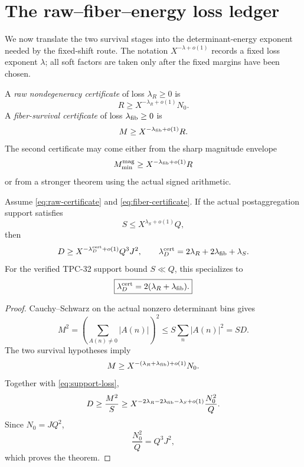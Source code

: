 \section{The raw--fiber--energy loss ledger}
\label{sec:loss-ledger}

We now translate the two survival stages into the determinant-energy
exponent needed by the fixed-shift route.  The notation
\(X^{-\lambda+o(1)}\) records a fixed loss exponent \(\lambda\);
all soft factors are taken only after the fixed margins have been
chosen.

\begin{definition}
\label{def:two-losses}
A \emph{raw nondegeneracy certificate} of loss \(\lambda_R\ge0\) is
\begin{equation}
 R\ge X^{-\lambda_R+o(1)}N_0.
\label{eq:raw-certificate}
\end{equation}
A \emph{fiber-survival certificate} of loss
\(\lambda_{\rm fib}\ge0\) is
\begin{equation}
 M\ge X^{-\lambda_{\rm fib}+o(1)}R.
\label{eq:fiber-certificate}
\end{equation}
The second certificate may come either from the sharp magnitude
envelope
\[
 M_{\min}^{\rm mag}
 \ge X^{-\lambda_{\rm fib}+o(1)}R
\]
or from a stronger theorem using the actual signed arithmetic.
\end{definition}

\begin{theorem}
\label{thm:certified-energy-loss}
Assume \eqref{eq:raw-certificate} and
\eqref{eq:fiber-certificate}.  If the actual postaggregation support
satisfies
\begin{equation}
 S\le X^{\lambda_S+o(1)}Q,
\label{eq:support-loss}
\end{equation}
then
\begin{equation}
 D\ge
 X^{-\lambda_D^{\rm cert}+o(1)}Q^3J^2,
\qquad
 \lambda_D^{\rm cert}
 =2\lambda_R+2\lambda_{\rm fib}+\lambda_S.
\label{eq:general-energy-ledger}
\end{equation}
For the verified TPC-32 support bound \(S\ll Q\), this specializes to
\begin{equation}
 \boxed{
 \lambda_D^{\rm cert}=2(\lambda_R+\lambda_{\rm fib}).}
\label{eq:special-energy-ledger}
\end{equation}
\end{theorem}

\begin{proof}
Cauchy--Schwarz on the actual nonzero determinant bins gives
\[
 M^2
 =\left(\sum_{A(n)\ne0}|A(n)|\right)^2
 \le S\sum_n|A(n)|^2
 =SD.
\]
The two survival hypotheses imply
\[
 M\ge
 X^{-(\lambda_R+\lambda_{\rm fib})+o(1)}N_0.
\]
Together with \eqref{eq:support-loss},
\[
 D\ge\frac{M^2}{S}
 \ge
 X^{-2\lambda_R-2\lambda_{\rm fib}-\lambda_S+o(1)}
 \frac{N_0^2}{Q}.
\]
Since \(N_0=JQ^2\),
\[
 \frac{N_0^2}{Q}=Q^3J^2,
\]
which proves the theorem.
\end{proof}

